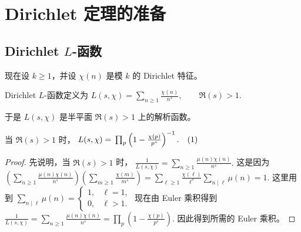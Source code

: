 

\chapter{Dirichlet 定理的准备}
\label{chap:dirichlet-theorem-preparation}



\section{\texorpdfstring{Dirichlet \(L\)-函数}{Dirichlet L-函数}}

现在设 $k\geq 1$，并设 $\chi(n)$ 是模 $k$ 的 Dirichlet 特征。

\begin{definition}[Dirichlet \(L\)-函数]
	Dirichlet \(L\)-函数定义为
	\(\textstyle L(s,\allowbreak{}\chi)=\allowbreak{}\sum_{n\geq\allowbreak{} 1}\frac{\chi(n)}{n^s},\allowbreak{} \qquad \Re(s)>1.\)
\end{definition}

于是 $L(s,\chi)$ 是半平面 $\Re(s)>1$ 上的解析函数。

\begin{lemma}[Euler 乘积]
	当 $\Re(s)>1$ 时，
	\(\textstyle L(s,\allowbreak{}\chi)=\allowbreak{}\prod_p\left(1-\frac{\chi(p)}{p^s}\right)^{-1}. \quad\textup{(1)}\)
\end{lemma}

\begin{proof}
	先说明，当 $\Re(s)>1$ 时，
	\(\textstyle \frac{1}{L(s,\allowbreak{}\chi)} =\allowbreak{} \sum_{n\geq\allowbreak{} 1}\frac{\mu(n)\chi(n)}{n^s}.\)
	这是因为
	\(\textstyle \left(\sum_{n\geq\allowbreak{} 1}\frac{\mu(n)\chi(n)}{n^s}\right) \left(\sum_{m\geq\allowbreak{} 1}\frac{\chi(m)}{m^s}\right) =\allowbreak{} \sum_{\ell\geq\allowbreak{} 1}\frac{\chi(\ell)}{\ell^s} \sum_{n\mid\allowbreak{} \ell}\mu(n) =\allowbreak{}1.\)
	这里用到
	\(\textstyle \sum_{n\mid \ell}\mu(n)= \begin{cases} 1, & \ell=1,\\ 0, & \ell>1. \end{cases}\)
	现在由 Euler 乘积得到
	\(\textstyle \frac{1}{L(s,\allowbreak{}\chi)} =\allowbreak{} \sum_{n\geq\allowbreak{} 1}\frac{\mu(n)\chi(n)}{n^s} =\allowbreak{} \prod_p\left(1-\frac{\chi(p)}{p^s}\right).\)
	因此得到所需的 Euler 乘积。
\end{proof}

